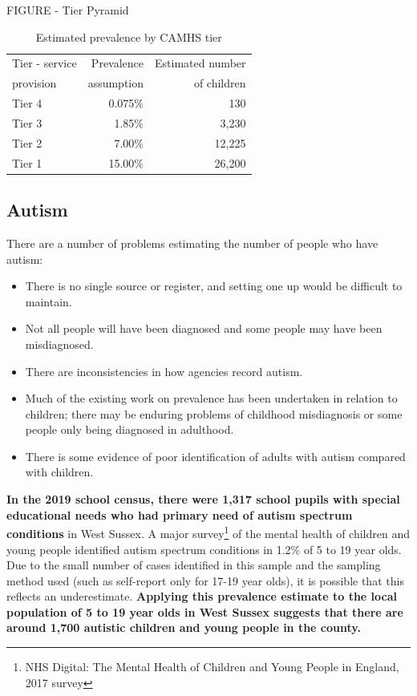 FIGURE - Tier Pyramid

\begin{table}[hbt]
    \caption{Estimated prevalence by CAMHS tier}
    \centering
    \begin{tabular}{lrr}
    \toprule
    Tier - service & Prevalence & Estimated number \\
    provision & assumption & of children \\
    \midrule
    Tier 4 & 0.075\% & 130 \\
    Tier 3 & 1.85\% & 3,230 \\
    Tier 2 & 7.00\% & 12,225 \\
    Tier 1 & 15.00\% & 26,200 \\
    \bottomrule
    \end{tabular}
    \label{tab:yp:camhs-tiers}
\end{table}

 
\subsection{Autism}
There are a number of problems estimating the number of people who have autism:
\begin{itemize}
    \item There is no single source or register, and setting one up would be difficult to maintain.
    \item Not all people will have been diagnosed and some people may have been misdiagnosed.
    \item There are inconsistencies in how agencies record autism.
    \item Much of the existing work on prevalence has been undertaken in relation to children; there may be enduring problems of childhood misdiagnosis or some people only being diagnosed in adulthood.
    \item There is some evidence of poor identification of adults with autism compared with children.
\end{itemize}

{\bfseries In the 2019 school census, there were 1,317 school pupils with special educational needs who had primary need of autism spectrum conditions} in West Sussex. A major survey\footnote{NHS Digital: The Mental Health of Children and Young People in England, 2017 survey} of the mental health of children and young people identified autism spectrum conditions in 1.2\% of 5 to 19 year olds. Due to the small number of cases identified in this sample and the sampling method used (such as self-report only for 17-19 year olds), it is possible that this reflects an underestimate. {\bfseries Applying this prevalence estimate to the local population of 5 to 19 year olds in West Sussex suggests that there are around 1,700 autistic children and young people in the county.}

